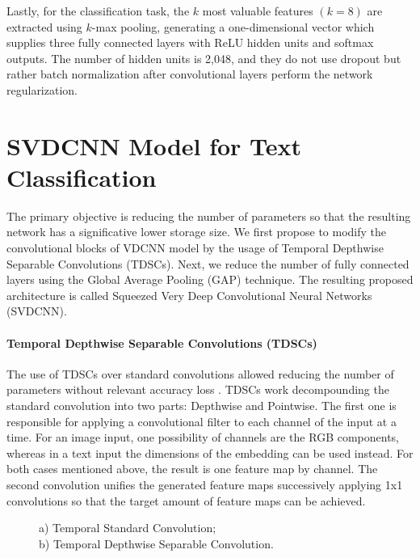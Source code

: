 \documentclass[conference]{IEEEtran}
\begin{document}
Lastly, for the classification task, the $k$ most valuable features $(k=8)$ are extracted using $k$-max pooling, generating a one-dimensional vector which supplies three fully connected layers with ReLU hidden units and softmax outputs. The number of hidden units is 2,048, and they do not use dropout but rather batch normalization after convolutional layers perform the network regularization.
\medskip
 
\section{SVDCNN Model for Text Classification}
\medskip
The primary objective is reducing the number of parameters so that the resulting network has a significative lower storage size. We first propose to modify the convolutional blocks of VDCNN model by the usage of Temporal Depthwise Separable Convolutions (TDSCs). Next, we reduce the number of fully connected layers using the Global Average Pooling (GAP) technique. The resulting proposed architecture is called Squeezed Very Deep Convolutional Neural Networks (SVDCNN).

\paragraph{Temporal Depthwise Separable Convolutions (TDSCs)}
The use of TDSCs over standard convolutions allowed reducing the number of parameters without relevant accuracy loss \cite{howard2017mobilenets}. TDSCs work decompounding the standard convolution into two parts: Depthwise and Pointwise. The first one is responsible for applying a convolutional filter to each channel of the input at a time. For an image input, one possibility of channels are the RGB components, whereas in a text input the dimensions of the embedding can be used instead. For both cases mentioned above, the result is one feature map by channel. The second convolution unifies the generated feature maps successively applying 1x1 convolutions so that the target amount of feature maps can be achieved.

\begin{figure}[htbp]
\begin{minipage}[t]{.5\linewidth}
\centering
{}
\end{minipage}\begin{minipage}[t]{.5\linewidth}
\centering
{}
\end{minipage}
\caption{a) Temporal Standard Convolution;\\b) Temporal Depthwise Separable Convolution.}
\label{fig:main}
\end{figure}
\end{document}
